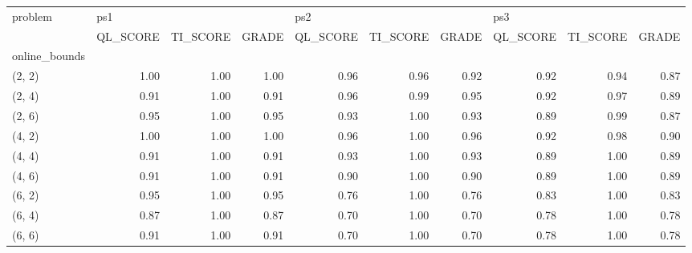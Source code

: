 \begin{tabular}{lrrrrrrrrr}
\toprule
problem & \multicolumn{3}{l}{ps1} & \multicolumn{3}{l}{ps2} & \multicolumn{3}{l}{ps3} \\
{} & QL\_SCORE & TI\_SCORE & GRADE & QL\_SCORE & TI\_SCORE & GRADE & QL\_SCORE & TI\_SCORE & GRADE \\
online\_bounds &          &          &       &          &          &       &          &          &       \\
\midrule
(2, 2)        &     1.00 &     1.00 &  1.00 &     0.96 &     0.96 &  0.92 &     0.92 &     0.94 &  0.87 \\
(2, 4)        &     0.91 &     1.00 &  0.91 &     0.96 &     0.99 &  0.95 &     0.92 &     0.97 &  0.89 \\
(2, 6)        &     0.95 &     1.00 &  0.95 &     0.93 &     1.00 &  0.93 &     0.89 &     0.99 &  0.87 \\
(4, 2)        &     1.00 &     1.00 &  1.00 &     0.96 &     1.00 &  0.96 &     0.92 &     0.98 &  0.90 \\
(4, 4)        &     0.91 &     1.00 &  0.91 &     0.93 &     1.00 &  0.93 &     0.89 &     1.00 &  0.89 \\
(4, 6)        &     0.91 &     1.00 &  0.91 &     0.90 &     1.00 &  0.90 &     0.89 &     1.00 &  0.89 \\
(6, 2)        &     0.95 &     1.00 &  0.95 &     0.76 &     1.00 &  0.76 &     0.83 &     1.00 &  0.83 \\
(6, 4)        &     0.87 &     1.00 &  0.87 &     0.70 &     1.00 &  0.70 &     0.78 &     1.00 &  0.78 \\
(6, 6)        &     0.91 &     1.00 &  0.91 &     0.70 &     1.00 &  0.70 &     0.78 &     1.00 &  0.78 \\
\bottomrule
\end{tabular}
